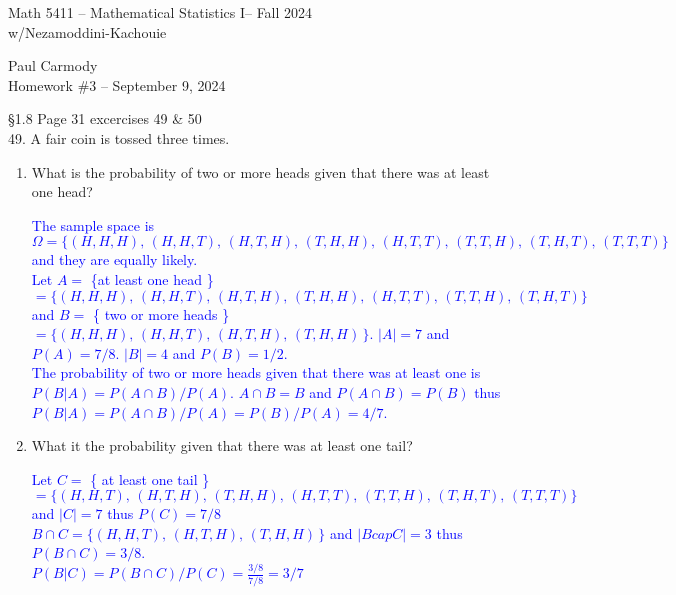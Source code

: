 \documentclass[10pt,a4paper]{report}
\newcommand{\CLASSNAME}{Math 5411 -- Mathematical Statistics I}
\newcommand{\PROFESSOR}{Nezamoddini-Kachouie}
\newcommand{\STUDENTNAME}{Paul Carmody}
\newcommand{\ASSIGNMENT}{Homework \#3 }
\newcommand{\DUEDATE}{September 9, 2024}
\newcommand{\SEMESTER}{Fall 2024}
\newcommand{\BLUE}[1]{\textcolor{blue}{#1}}
\begin{document}
\begin{center}
	\Large{\CLASSNAME -- \SEMESTER} \\
	\large{w/\PROFESSOR}
\end{center}
\begin{center}
	\STUDENTNAME \\
	\ASSIGNMENT -- \DUEDATE\\
\end{center}

\S 1.8 Page 31 excercises 49 \& 50\\

49.  A fair coin is tossed three times.
\begin{enumerate}[label=\alph*.]
\item What is the probability of two or more heads given that there was at least one head?

\BLUE{
The sample space is $\Omega = \{ (H,H,H),\,(H,H,T),\,(H,T,H),\,(T,H,H),\,(H,T,T),\,(T,T,H),\,(T,H,T),\,(T,T,T) \}$ and they are equally likely.\\
Let $A = $ \{at least one head \} $= \{ (H,H,H),\,(H,H,T),\,(H,T,H),\,(T,H,H),\,(H,T,T),\,(T,T,H),\,(T,H,T)\}$ and $B = $ \{ two or more heads \} $= \{ (H,H,H),\,(H,H,T),\,(H,T,H),\,(T,H,H)\,\}$.  $|A| = 7$ and $P(A)=7/8$.  $|B| = 4$ and $P(B) = 1/2$.\\
The probability of two or more heads given that there was at least one is $P(B|A) = P(A \cap B)/P(A)$.  $A \cap B = B$ and $P(A \cap B) = P(B)$ thus $P(B|A) = P(A \cap B)/P(A) = P(B)/P(A) = 4/7$.
}

\item What it the probability given that there was at least one tail?  

\BLUE{Let $C = $ \{ at least one tail \} $= \{ (H,H,T),\,(H,T,H),\,(T,H,H),\,(H,T,T),\,(T,T,H),\,(T,H,T),\,(T,T,T) \}$ and $|C| = 7$ thus $P(C) = 7/8$\\
$B \cap C = \{ (H,H,T),\,(H,T,H),\,(T,H,H)\,\}$ and $|B cap C| = 3$ thus $P(B \cap C) = 3/8$.  \\
$P(B|C) = P(B\cap C)/P(C) = \frac{3/8}{7/8} = 3/7$
}

\end{enumerate}
\end{document}
